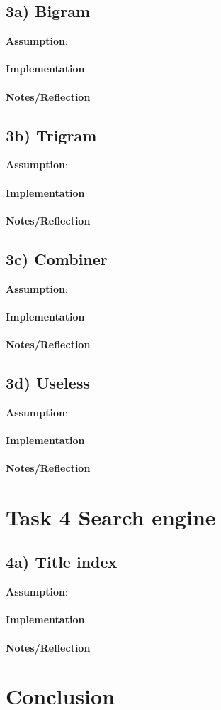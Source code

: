 \documentclass[fleqn,10pt]{wlscirep}
\begin{document}
\subsection*{3a) Bigram }
\textbf{Assumption}:  \\ \\
\textbf{Implementation}  \\ \\
\textbf{Notes/Reflection}

\subsection*{3b) Trigram }
\textbf{Assumption}:  \\ \\
\textbf{Implementation}  \\ \\
\textbf{Notes/Reflection}

\subsection*{3c) Combiner }
\textbf{Assumption}:  \\ \\
\textbf{Implementation}  \\ \\
\textbf{Notes/Reflection}

\subsection*{3d) Useless}
\textbf{Assumption}:  \\ \\
\textbf{Implementation}  \\ \\
\textbf{Notes/Reflection}

\section*{Task 4 Search engine}
\subsection*{4a) Title index}
\textbf{Assumption}:  \\ \\
\textbf{Implementation}  \\ \\
\textbf{Notes/Reflection}

\section*{Conclusion}
\end{document}
